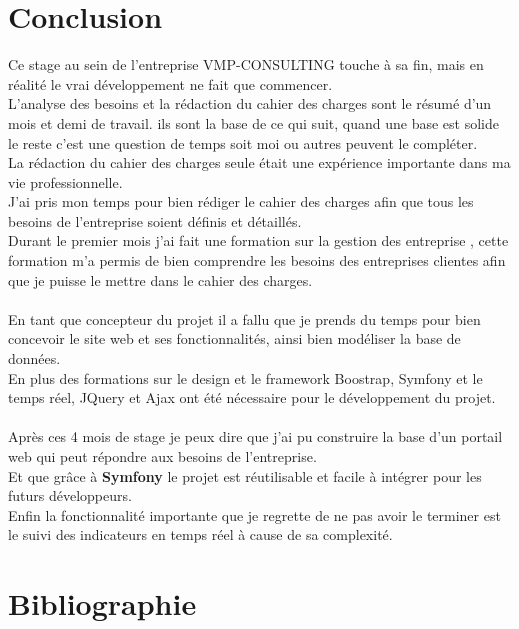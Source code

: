 \documentclass[12pt]{article}
\begin{document}
\newpage
\section{Conclusion}

Ce stage au sein de l'entreprise VMP-CONSULTING touche à sa fin, mais en réalité le vrai développement ne fait que commencer.\\

L'analyse des besoins et la rédaction du cahier des charges sont le résumé d'un mois et demi de travail. ils sont la base de ce qui suit, quand une base est solide le reste c'est une question de temps soit moi ou autres peuvent le compléter.\\
La rédaction du cahier des charges seule était une expérience importante dans ma vie professionnelle.\\ 
J'ai pris mon temps pour bien rédiger le cahier des charges afin que tous les besoins de l'entreprise soient définis et détaillés.\\
Durant le premier mois j'ai fait une formation sur la gestion des entreprise , cette formation m'a permis de bien comprendre  les besoins des entreprises clientes afin que je puisse le mettre dans le cahier des charges.  \\ \\

En tant que concepteur du projet il a fallu que je prends du temps pour bien concevoir le site web et ses fonctionnalités, ainsi bien modéliser la base de données. \\
En plus  des formations sur le design et le framework Boostrap, Symfony et le temps réel,  JQuery et Ajax ont été nécessaire pour le développement du projet.\\ \\

Après ces 4 mois de stage je peux dire que j'ai pu construire la base d'un portail web qui peut répondre aux besoins de l'entreprise.\\
Et que grâce à \textbf{Symfony} le projet est réutilisable et facile à intégrer pour les futurs développeurs.\\
Enfin la fonctionnalité importante que je regrette de ne pas avoir le terminer est le suivi des indicateurs en temps réel à cause de sa complexité.





\newpage
\section{Bibliographie}
\end{document}
